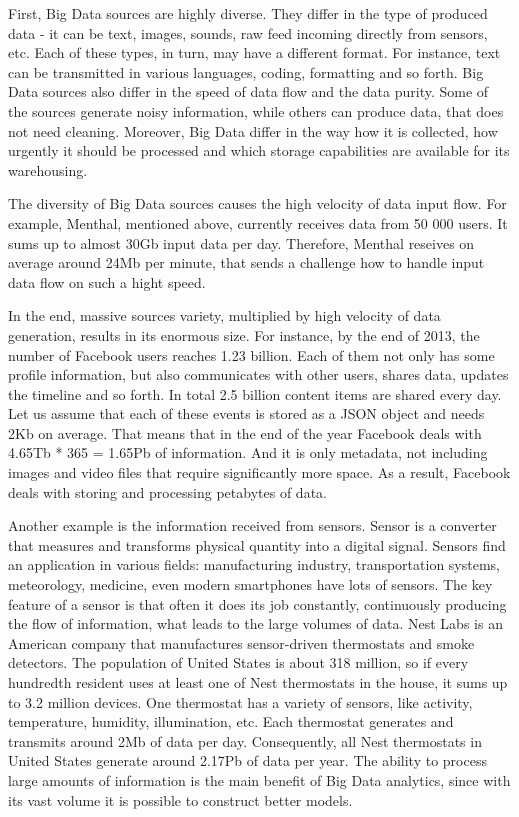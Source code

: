 First, Big Data sources are highly diverse.
They differ in the type of produced data - it can be text, images, sounds, raw feed incoming directly from sensors, etc.
Each of these types, in turn, may have a different format.
For instance, text can be transmitted in various languages, coding, formatting and so forth.
Big Data sources also differ in the speed of data flow and the data purity.  
Some of the sources generate noisy information, while others can produce data, that does not need cleaning.
Moreover, Big Data differ in the way how it is collected, how urgently it should be processed and which storage capabilities are available for its warehousing.

The diversity of Big Data sources causes the high velocity of data input flow.
For example, Menthal, mentioned above, currently receives data from 50 000 users.
It sums up to almost 30Gb input data per day.
Therefore, Menthal reseives on average around 24Mb per minute, that sends a challenge how to handle input data flow on such a hight speed.

In the end, massive sources variety, multiplied by high velocity of data generation, results in its enormous size.
For instance, by the end of 2013, the number of Facebook users reaches 1.23 billion.
Each of them not only has some profile information, but also communicates with other users, shares data, updates the timeline and so forth.
In total 2.5 billion content items are shared every day.
Let us assume that each of these events is stored as a JSON object and needs 2Kb on average.
That means that in the end of the year Facebook deals with 4.65Tb * 365 = 1.65Pb of information.
And it is only metadata, not including images and video files that require significantly more space. 
As a result, Facebook deals with storing and processing petabytes of data.

Another example is the information received from sensors.
Sensor is a converter that measures and transforms physical quantity into a digital signal.
Sensors find an application in various fields: manufacturing industry, transportation systems, meteorology, medicine, even modern smartphones have lots of sensors.
The key feature of a sensor is that often it does its job constantly, continuously producing the flow of information, what leads to the large volumes of data.
Nest Labs is an American company that manufactures sensor-driven thermostats and smoke detectors.
The population of United States is about 318 million, so if every hundredth resident uses at least one of Nest thermostats in the house, it sums up to 3.2 million devices.
One thermostat has a variety of sensors, like activity, temperature, humidity, illumination, etc.
Each thermostat generates and transmits around 2Mb of data per day.
Consequently, all Nest thermostats in United States generate around 2.17Pb of data per year. 
The ability to process large amounts of information is the main benefit of Big Data analytics, since with its vast volume it is possible to construct better models.

